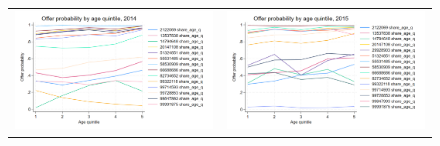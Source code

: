 \documentclass[12pt]{article}
\begin{document}
\begin{figure}[H] 
\caption{}
\label{fig:ie3_16}
\centering{}%
\begin{tabular}{cc}
\includegraphics[scale=0.27]{figures/IE3_supply_offerprob_age_q_2014.png} &
\includegraphics[scale=0.27]{figures/IE3_supply_offerprob_age_q_2015.png}
\end{tabular}
\end{figure}
\end{document}
